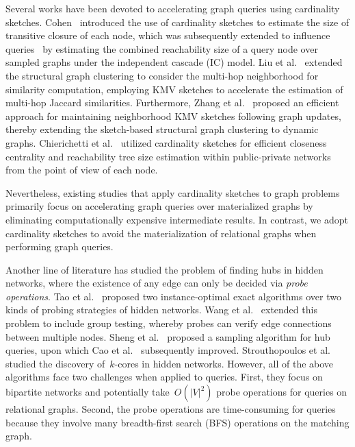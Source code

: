 \vspace{1mm}
Several works have been devoted to accelerating graph queries using cardinality sketches. Cohen~\cite{cohen1997size} introduced the use of cardinality sketches to estimate the size of transitive closure of each node, which was subsequently extended to influence queries~\cite{cohen2014sketch} by estimating the combined reachability size of a query node over sampled graphs under the independent cascade (IC) model. Liu et al.~\cite{liu2023efficient} extended the structural graph clustering to consider the multi-hop neighborhood for similarity computation, employing KMV sketches to accelerate the estimation of multi-hop Jaccard similarities. Furthermore, Zhang et al.~\cite{zhang2022effective} proposed an efficient approach for maintaining neighborhood KMV sketches following graph updates, thereby extending the sketch-based structural graph clustering to dynamic graphs. Chierichetti et al.~\cite{chierichetti2015efficient} utilized cardinality sketches for efficient closeness centrality and reachability tree size estimation within public-private networks from the point of view of each node.

Nevertheless, existing studies that apply cardinality sketches to graph problems primarily focus on accelerating graph queries over materialized graphs by eliminating computationally expensive intermediate results. In contrast, we adopt cardinality sketches to avoid the materialization of relational graphs when performing graph queries.

\vspace{1mm}
Another line of literature has studied the problem of finding hubs in hidden networks, where the existence of any edge can only be decided via \emph{probe operations}.
Tao et al.~\cite{tao2010finding} proposed two instance-optimal exact algorithms over two kinds of probing strategies of hidden networks.
Wang et al.~\cite{wang2012identifying} extended this problem to include group testing, whereby probes can verify edge connections between multiple nodes.
Sheng et al.~\cite{sheng2012exact} proposed a sampling algorithm for hub queries, upon which Cao et al.~\cite{cao2015top} subsequently improved.
Strouthopoulos et al.~\cite{StrouthopoulosP19} studied the discovery of~$k$-cores in hidden networks.
However, all of the above algorithms face two challenges when applied to \ced queries.
First, they focus on bipartite networks and potentially take~$O(|V|^2)$ probe operations for \ced queries on relational graphs.
Second, the probe operations are time-consuming for \ced queries because they involve many breadth-first search (BFS) operations on the matching graph.

